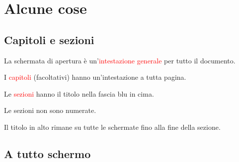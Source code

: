 \documentclass[12pt,italian,oneside]{report}
\newcounter{cap}
\newcommand{\rosso}[1]{\textcolor{red}{#1}}
\begin{document}
\maketitle

\raggedright


\chapter{Alcune cose\label{intestazioneCapitolo}}


\section{Capitoli e sezioni}

\begin{firstheadlineitemize}

\item La schermata di apertura \`e un'\rosso{intesta\-zione generale} per tutto il documento.

\pause

\item I \rosso{capitoli} (facoltativi) hanno un'intestazione a tutta pagina.

\pause

\item Le \rosso{sezioni} hanno il titolo nella fascia blu in cima.

\begin{secondheadlineitemize}

\pause

\item Le sezioni non sono numerate.

\end{secondheadlineitemize}
\end{firstheadlineitemize}

\newpage

\begin{secondheadlineitemize}

\item Il titolo in alto rimane su tutte le schermate fino alla fine della sezione.

\end{secondheadlineitemize}

\section{A tutto schermo}
\end{document}
